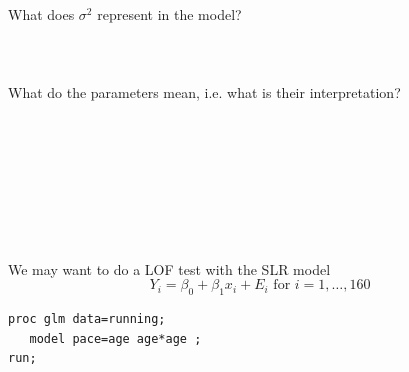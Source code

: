 \newpage

What does $\sigma^2$ represent in the model?\\~\\~\\~\\
What do the parameters mean, i.e. what is their interpretation?\\~\\~\\~\\~\\~\\~\\~\\~\\
 

We may want to do a LOF test with the SLR model 
$$ Y_i = \beta_0 + \beta_1 x_i + E_i \mbox{ for }i=1,\ldots,160$$

\begin{small}
\begin{verbatim}
proc glm data=running; 
   model pace=age age*age ; 
run;
\end{verbatim}
\end{small}

